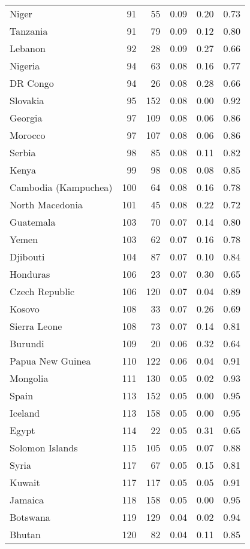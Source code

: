 \begin{longtable}[t]{lrrrrr}
Niger & 91 & 55 & 0.09 & 0.20 & 0.73\\
\addlinespace
Tanzania & 91 & 79 & 0.09 & 0.12 & 0.80\\
Lebanon & 92 & 28 & 0.09 & 0.27 & 0.66\\
Nigeria & 94 & 63 & 0.08 & 0.16 & 0.77\\
DR Congo & 94 & 26 & 0.08 & 0.28 & 0.66\\
Slovakia & 95 & 152 & 0.08 & 0.00 & 0.92\\
\addlinespace
Georgia & 97 & 109 & 0.08 & 0.06 & 0.86\\
Morocco & 97 & 107 & 0.08 & 0.06 & 0.86\\
Serbia & 98 & 85 & 0.08 & 0.11 & 0.82\\
Kenya & 99 & 98 & 0.08 & 0.08 & 0.85\\
Cambodia (Kampuchea) & 100 & 64 & 0.08 & 0.16 & 0.78\\
\addlinespace
North Macedonia & 101 & 45 & 0.08 & 0.22 & 0.72\\
Guatemala & 103 & 70 & 0.07 & 0.14 & 0.80\\
Yemen & 103 & 62 & 0.07 & 0.16 & 0.78\\
Djibouti & 104 & 87 & 0.07 & 0.10 & 0.84\\
Honduras & 106 & 23 & 0.07 & 0.30 & 0.65\\
\addlinespace
Czech Republic & 106 & 120 & 0.07 & 0.04 & 0.89\\
Kosovo & 108 & 33 & 0.07 & 0.26 & 0.69\\
Sierra Leone & 108 & 73 & 0.07 & 0.14 & 0.81\\
Burundi & 109 & 20 & 0.06 & 0.32 & 0.64\\
Papua New Guinea & 110 & 122 & 0.06 & 0.04 & 0.91\\
\addlinespace
Mongolia & 111 & 130 & 0.05 & 0.02 & 0.93\\
Spain & 113 & 152 & 0.05 & 0.00 & 0.95\\
Iceland & 113 & 158 & 0.05 & 0.00 & 0.95\\
Egypt & 114 & 22 & 0.05 & 0.31 & 0.65\\
Solomon Islands & 115 & 105 & 0.05 & 0.07 & 0.88\\
\addlinespace
Syria & 117 & 67 & 0.05 & 0.15 & 0.81\\
Kuwait & 117 & 117 & 0.05 & 0.05 & 0.91\\
Jamaica & 118 & 158 & 0.05 & 0.00 & 0.95\\
Botswana & 119 & 129 & 0.04 & 0.02 & 0.94\\
Bhutan & 120 & 82 & 0.04 & 0.11 & 0.85\\

\end{longtable}
